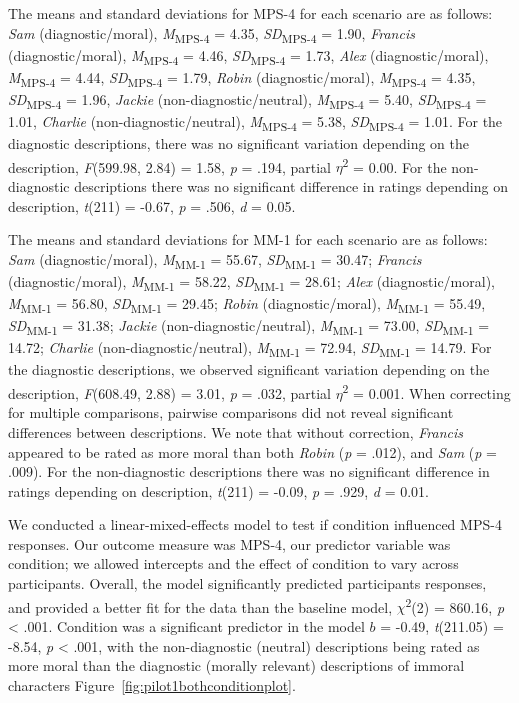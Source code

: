 \documentclass[
  english,
  man,floatsintext]{apa7}
\begin{document}
The means and standard deviations for MPS-4 for each scenario are as follows:
\emph{Sam} (diagnostic/moral),
\emph{M}\textsubscript{MPS-4} = 4.35, \emph{SD}\textsubscript{MPS-4} = 1.90,
\emph{Francis} (diagnostic/moral),
\emph{M}\textsubscript{MPS-4} = 4.46, \emph{SD}\textsubscript{MPS-4} = 1.73,
\emph{Alex} (diagnostic/moral),
\emph{M}\textsubscript{MPS-4} = 4.44, \emph{SD}\textsubscript{MPS-4} = 1.79,
\emph{Robin} (diagnostic/moral),
\emph{M}\textsubscript{MPS-4} = 4.35, \emph{SD}\textsubscript{MPS-4} = 1.96,
\emph{Jackie} (non-diagnostic/neutral),
\emph{M}\textsubscript{MPS-4} = 5.40, \emph{SD}\textsubscript{MPS-4} = 1.01,
\emph{Charlie} (non-diagnostic/neutral),
\emph{M}\textsubscript{MPS-4} = 5.38, \emph{SD}\textsubscript{MPS-4} = 1.01. For the diagnostic descriptions, there was no significant variation depending on the description, \emph{F}(599.98, 2.84) = 1.58, \emph{p} = .194, partial \(\eta\)\textsuperscript{2} = 0.00. For the non-diagnostic descriptions there was no significant difference in ratings depending on description, \emph{t}(211) = -0.67, \emph{p} = .506, \emph{d} = 0.05.

The means and standard deviations for MM-1 for each scenario are as follows:
\emph{Sam} (diagnostic/moral),
\emph{M}\textsubscript{MM-1} = 55.67, \emph{SD}\textsubscript{MM-1} = 30.47;
\emph{Francis} (diagnostic/moral),
\emph{M}\textsubscript{MM-1} = 58.22, \emph{SD}\textsubscript{MM-1} = 28.61;
\emph{Alex} (diagnostic/moral),
\emph{M}\textsubscript{MM-1} = 56.80, \emph{SD}\textsubscript{MM-1} = 29.45;
\emph{Robin} (diagnostic/moral),
\emph{M}\textsubscript{MM-1} = 55.49, \emph{SD}\textsubscript{MM-1} = 31.38;
\emph{Jackie} (non-diagnostic/neutral),
\emph{M}\textsubscript{MM-1} = 73.00, \emph{SD}\textsubscript{MM-1} = 14.72;
\emph{Charlie} (non-diagnostic/neutral),
\emph{M}\textsubscript{MM-1} = 72.94, \emph{SD}\textsubscript{MM-1} = 14.79. For the diagnostic descriptions, we observed significant variation depending on the description, \emph{F}(608.49, 2.88) = 3.01, \emph{p} = .032, partial \(\eta\)\textsuperscript{2} = 0.001. When correcting for multiple comparisons, pairwise comparisons did not reveal significant differences between descriptions. We note that without correction, \emph{Francis} appeared to be rated as more moral than both \emph{Robin} (\emph{p} = .012), and \emph{Sam} (\emph{p} = .009). For the non-diagnostic descriptions there was no significant difference in ratings depending on description, \emph{t}(211) = -0.09, \emph{p} = .929, \emph{d} = 0.01.

We conducted a linear-mixed-effects model to test if condition influenced MPS-4 responses. Our outcome measure was MPS-4, our predictor variable was condition; we allowed intercepts and the effect of condition to vary across participants.
Overall, the model significantly predicted participants responses, and provided a better fit for the data than the baseline model, \(\chi\)\textsuperscript{2}(2) = 860.16, \emph{p} \textless{} .001. Condition was a significant predictor in the model \(b\) = -0.49, \emph{t}(211.05) = -8.54, \emph{p} \textless{} .001, with the non-diagnostic (neutral) descriptions being rated as more moral than the diagnostic (morally relevant) descriptions of immoral characters Figure~\ref{fig:pilot1bothconditionplot}.
\end{document}
